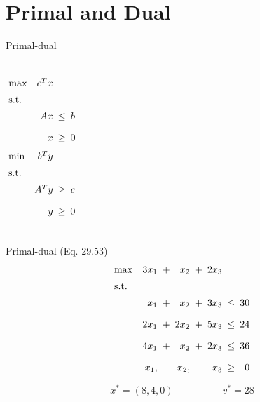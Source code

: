 \section{Primal and Dual}

\begin{frame}{Primal-dual}
  \begin{columns}
	  \begin{equation*}
		\setlength\arraycolsep{2.5pt}
		\begin{array}{l@{\quad}rcc}
		  \max 	& c^{T}x	&	&	\\[5pt]
		  \text{s.t.} 	&	&	&	\\[5pt]
				&	Ax 	&	\leq	&	b	\\[10pt]
				&	x	& 	\geq 	&	0	
		\end{array}
	  \end{equation*}
	  \begin{equation*}
		\setlength\arraycolsep{2.5pt}
		\begin{array}{l@{\quad}rcc}
		  \min 	& b^{T}y	&	&	\\[5pt]
		  \text{s.t.} 	&	&	&	\\[5pt]
				&	A^{T}y 	&	\geq	&	c	\\[10pt]
				&	y	& 	\geq 	&	0	
		\end{array}
	  \end{equation*}
  \end{columns}
\end{frame}
\begin{frame}{Primal-dual (Eq. 29.53)}
  \begin{equation*}
	\setlength\arraycolsep{2.5pt}
	\begin{array}{l@{\quad}rcrcrcr}
	  \max 	& 3x_1  &+&	x_2		&+&	2x_3	&	&	\\[5pt]
	  \text{s.t.} 	&	&	&	&	&	&	&	\\[5pt]
			& x_1   	&+&	x_2	&+&	3x_3	&\leq& 30 \\[10pt]
			& 2x_1	&+&	2x_2 	&+& 5x_3 	&\leq& 24 \\[10pt]
			& 4x_1   	&+&	x_2		&+&	2x_3	&\leq& 36	\\[10pt]
			& x_1,	&&	x_2,	&&	x_3	&\geq&	0
	\end{array}
  \end{equation*}

  \vspace{0.60cm}

  \[
	x^{\ast} = (8, 4, 0) \qquad\qquad\quad v^{\ast} = 28
  \]
\end{frame}
